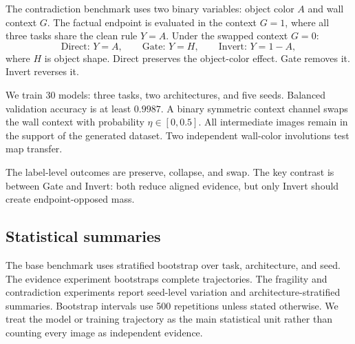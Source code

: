 The contradiction benchmark uses two binary variables: object color $A$ and wall context $G$. The factual endpoint is evaluated in the context $G=1$, where all three tasks share the clean rule $Y=A$. Under the swapped context $G=0$:
\[
\text{Direct: }Y=A,
\qquad
\text{Gate: }Y=H,
\qquad
\text{Invert: }Y=1-A,
\]
where $H$ is object shape. Direct preserves the object-color effect. Gate removes it. Invert reverses it.

We train 30 models: three tasks, two architectures, and five seeds. Balanced validation accuracy is at least $0.9987$. A binary symmetric context channel swaps the wall context with probability $\eta\in[0,0.5]$. All intermediate images remain in the support of the generated dataset. Two independent wall-color involutions test map transfer.

The label-level outcomes are preserve, collapse, and swap. The key contrast is between Gate and Invert: both reduce aligned evidence, but only Invert should create endpoint-opposed mass.

\subsection{Statistical summaries}

The base benchmark uses stratified bootstrap over task, architecture, and seed. The evidence experiment bootstraps complete trajectories. The fragility and contradiction experiments report seed-level variation and architecture-stratified summaries. Bootstrap intervals use 500 repetitions unless stated otherwise. We treat the model or training trajectory as the main statistical unit rather than counting every image as independent evidence.
